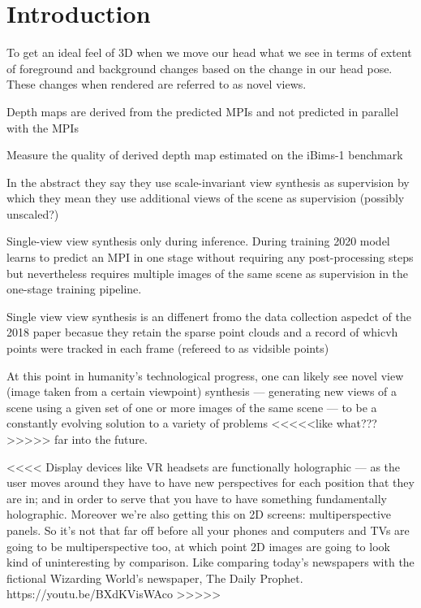 \chapter{Introduction}\label{ch1:introduction}

To get an ideal feel of 3D when we move our head what we see in terms of extent of foreground and background changes based on the change in our head pose. These changes when rendered are referred to as novel views.  

Depth maps are derived from the predicted MPIs and not predicted in parallel with the MPIs

Measure the quality of derived depth map estimated on the iBims-1 benchmark

In the abstract they say they use scale-invariant view synthesis as supervision by which they mean they use additional views of the scene  as supervision (possibly unscaled?)

Single-view view synthesis only during inference. During training 2020 model learns to predict an MPI in one stage without requiring any post-processing steps but nevertheless requires multiple images of the same scene as supervision in the one-stage training pipeline.

Single view view synthesis is an diffenert fromo the data collection aspedct of the 2018 paper becasue they retain the sparse point clouds and a record of whicvh points were tracked in each frame (refereed to as vidsible points)




At this point in humanity's technological progress, one can likely see novel view (image taken from a certain viewpoint) synthesis --- generating new views of a scene using a given set of one or more images of the same scene --- to be a constantly evolving solution to a variety of problems <<<<<like what???>>>>> far into the future.

<<<< Display devices like VR headsets are functionally holographic --- as the user moves around they have to have new perspectives for each position that they are in; and in order to serve that you have to have something fundamentally holographic. Moreover we're also getting this on 2D screens: multiperspective panels. So it's not that far off before all your phones and computers and TVs are going to be multiperspective too, at which point 2D images are going to look kind of uninteresting by comparison. Like comparing today's newspapers with the fictional Wizarding World's newspaper, The Daily Prophet. https://youtu.be/BXdKVisWAco >>>>>



